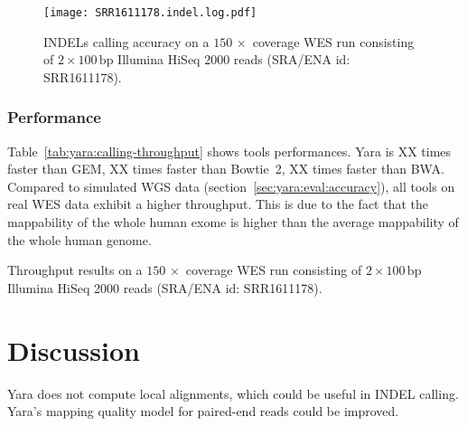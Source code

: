 \begin{figure}[t]
\begin{center}
\caption[Yara INDELs calling accuracy]{INDELs calling accuracy on a $150\, \times$ coverage WES run consisting of $2 \times 100\,\text{bp}$ Illumina HiSeq 2000 reads (SRA/ENA id: SRR1611178).}
\label{fig:yara:calling-indels}
\texttt{[image: SRR1611178.indel.log.pdf]}
\end{center}
\end{figure}

\subsubsection{Performance}

Table~\ref{tab:yara:calling-throughput} shows tools performances.
Yara is XX times faster than GEM, XX times faster than Bowtie~2, XX times faster than BWA.
Compared to simulated WGS data (section~\ref{sec:yara:eval:accuracy}), all tools on real WES data exhibit a higher throughput. This is due to the fact that the mappability of the whole human exome is higher than the average mappability of the whole human genome.

\begin{table}[b]
\begin{center}
\caption[Yara throughput results on SRR1611178]{Throughput results on a $150\, \times$ coverage WES run consisting of $2 \times 100\,\text{bp}$ Illumina HiSeq 2000 reads (SRA/ENA id: SRR1611178).}
\sffamily

\label{tab:yara:calling-throughput}
\end{center}
\end{table}



\section{Discussion}

Yara does not compute local alignments, which could be useful in INDEL calling.
Yara's mapping quality model for paired-end reads could be improved.
